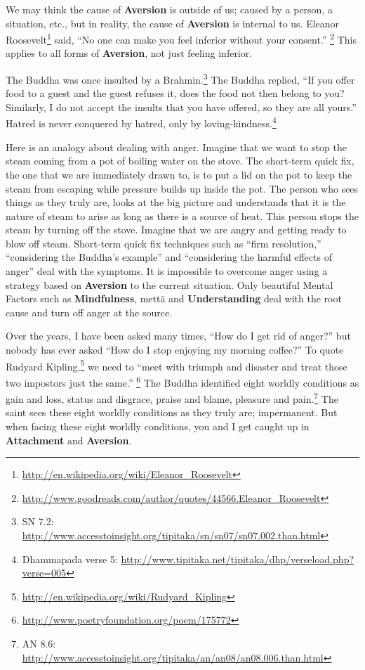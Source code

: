 We may think the cause of \textbf{Aversion} is outside of us; caused by a person, a situation, etc., but in reality, the cause of \textbf{Aversion} is internal to us. Eleanor Roosevelt\footnote{\url{http://en.wikipedia.org/wiki/Eleanor_Roosevelt}} said, “No one can make you feel inferior without your consent.” \footnote{\url{http://www.goodreads.com/author/quotes/44566.Eleanor_Roosevelt}} This applies to all forms of \textbf{Aversion}, not just feeling inferior.

The Buddha was once insulted by a Brahmin.\footnote{SN 7.2: \url{http://www.accesstoinsight.org/tipitaka/sn/sn07/sn07.002.than.html}} The Buddha replied, “If you offer food to a guest and the guest refuses it, does the food not then belong to you? Similarly, I do not accept the insults that you have offered, so they are all yours.” Hatred is never conquered by hatred, only by loving-kindness.\footnote{Dhammapada verse 5: \url{http://www.tipitaka.net/tipitaka/dhp/verseload.php?verse=005}}

Here is an analogy about dealing with anger. Imagine that we want to stop the steam coming from a pot of boiling water on the stove. The short-term quick fix, the one that we are immediately drawn to, is to put a lid on the pot to keep the steam from escaping while pressure builds up inside the pot. The person who sees things as they truly are, looks at the big picture and understands that it is the nature of steam to arise as long as there is a source of heat. This person stops the steam by turning off the stove. Imagine that we are angry and getting ready to blow off steam. Short-term quick fix techniques such as “firm resolution,” “considering the Buddha’s example” and “considering the harmful effects of anger” deal with the symptoms. It is impossible to overcome anger using a strategy based on \textbf{Aversion} to the current situation. Only beautiful Mental Factors such as \textbf{Mindfulness}, mettā and \textbf{Understanding} deal with the root cause and turn off anger at the source.

Over the years, I have been asked many times, “How do I get rid of anger?” but nobody has ever asked “How do I stop enjoying my morning coffee?” To quote Rudyard Kipling,\footnote{\url{http://en.wikipedia.org/wiki/Rudyard_Kipling}} we need to “meet with triumph and disaster and treat those two impostors just the same.” \footnote{\url{http://www.poetryfoundation.org/poem/175772}} The Buddha identified eight worldly conditions as gain and loss, status and disgrace, praise and blame, pleasure and pain.\footnote{AN 8.6: \url{http://www.accesstoinsight.org/tipitaka/an/an08/an08.006.than.html}} The saint sees these eight worldly conditions as they truly are; impermanent. But when facing these eight worldly conditions, you and I get caught up in \textbf{Attachment} and \textbf{Aversion}.

